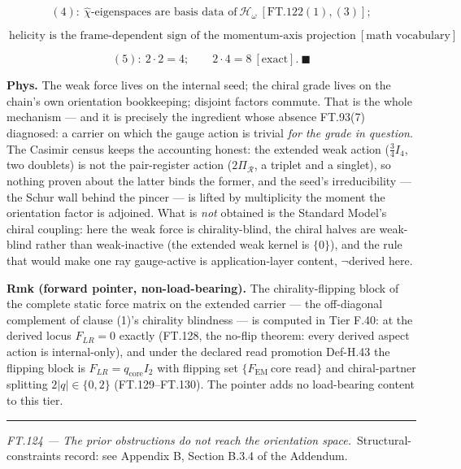 \begin{theorem}
\[
(4):\ \hat\chi\text{-eigenspaces are basis data of}\ \mathcal H_\omega\ [\mathrm{FT.122}(1),(3)];
\]

\[
\ \text{helicity is the frame-dependent sign of the momentum-axis projection}\ [\text{math vocabulary}]
\]

\[
(5):\ 2\cdot2=4;\qquad2\cdot4=8\ [\text{exact}].\ \blacksquare
\]

\textbf{Phys.} The weak force lives on the internal seed; the chiral grade lives on the chain's own orientation bookkeeping; disjoint factors commute. That is the whole mechanism — and it is precisely the ingredient whose absence FT.93(7) diagnosed: a carrier on which the gauge action is trivial \textit{for the grade in question}. The Casimir census keeps the accounting honest: the extended weak action ($\tfrac34I_4$, two doublets) is not the pair-register action ($2\Pi_{\mathcal R}$, a triplet and a singlet), so nothing proven about the latter binds the former, and the seed's irreducibility — the Schur wall behind the pincer — is lifted by multiplicity the moment the orientation factor is adjoined. What is \textit{not} obtained is the Standard Model's chiral coupling: here the weak force is chirality-blind, the chiral halves are weak-blind rather than weak-inactive (the extended weak kernel is $\{0\}$), and the rule that would make one ray gauge-active is application-layer content, $\neg$derived here.

\textbf{Rmk (forward pointer, non-load-bearing).} The chirality-flipping block of the complete static force matrix on the extended carrier — the off-diagonal complement of clause (1)'s chirality blindness — is computed in Tier F.40: at the derived locus $F_{LR}=0$ exactly (FT.128, the no-flip theorem: every derived aspect action is internal-only), and under the declared read promotion Def-H.43 the flipping block is $F_{LR}=q_{\mathrm{core}}I_2$ with flipping set $\{F_{\mathrm{EM}}\ \text{core read}\}$ and chiral-partner splitting $2|q|\in\{0,2\}$ (FT.129–FT.130). The pointer adds no load-bearing content to this tier.

\vspace{2pt}\noindent\rule{\textwidth}{0.4pt}\vspace{2pt}

\end{theorem}

\medskip\noindent\textit{\texorpdfstring{FT.124 — The prior obstructions do not reach the orientation space}{FT.124 - The prior obstructions do not reach the orientation space}.}\ Structural-constraints record: see Appendix B, Section B.3.4 of the Addendum.\par\medskip

